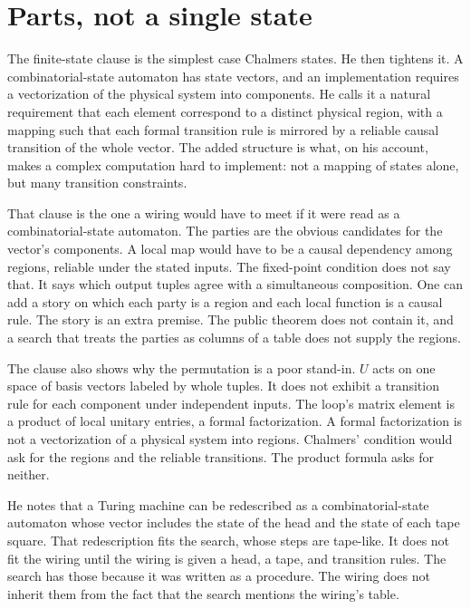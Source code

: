 \documentclass[11pt]{article}
\begin{document}
\section{Parts, not a single state}
\label{sec:csa}

The finite-state clause is the simplest case Chalmers states. He then tightens it. A combinatorial-state automaton has state vectors, and an implementation requires a vectorization of the physical system into components. He calls it a natural requirement that each element correspond to a distinct physical region, with a mapping such that each formal transition rule is mirrored by a reliable causal transition of the whole vector. The added structure is what, on his account, makes a complex computation hard to implement: not a mapping of states alone, but many transition constraints.

That clause is the one a wiring would have to meet if it were read as a combinatorial-state automaton. The parties are the obvious candidates for the vector's components. A local map would have to be a causal dependency among regions, reliable under the stated inputs. The fixed-point condition does not say that. It says which output tuples agree with a simultaneous composition. One can add a story on which each party is a region and each local function is a causal rule. The story is an extra premise. The public theorem does not contain it, and a search that treats the parties as columns of a table does not supply the regions.

The clause also shows why the permutation is a poor stand-in. \(U\) acts on one space of basis vectors labeled by whole tuples. It does not exhibit a transition rule for each component under independent inputs. The loop's matrix element is a product of local unitary entries, a formal factorization. A formal factorization is not a vectorization of a physical system into regions. Chalmers' condition would ask for the regions and the reliable transitions. The product formula asks for neither.

He notes that a Turing machine can be redescribed as a combinatorial-state automaton whose vector includes the state of the head and the state of each tape square. That redescription fits the search, whose steps are tape-like. It does not fit the wiring until the wiring is given a head, a tape, and transition rules. The search has those because it was written as a procedure. The wiring does not inherit them from the fact that the search mentions the wiring's table.
\end{document}
